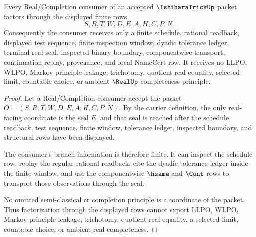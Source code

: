 \begin{theorem}
\label{thm:ishihara-trick-real-seal-nonescape}
Every Real/Completion consumer of an accepted $\IshiharaTrickUp$ packet factors through the displayed finite rows
$$
S,R,T,W,D,E,A,H,C,P,N.
$$
Consequently the consumer receives only a finite schedule, rational readback, displayed test sequence, finite inspection window, dyadic tolerance ledger, terminal real seal, inspected binary boundary, componentwise transport, continuation replay, provenance, and local NameCert row. It receives no LLPO, WLPO, Markov-principle leakage, trichotomy, quotient real equality, selected limit, countable choice, or ambient $\RealUp$ completeness principle.
\end{theorem}
\begin{proof}
Let a Real/Completion consumer accept the packet $O=(S,R,T,W,D,E,A,H,C,P,N)$. By the carrier definition, the only real-facing coordinate is the seal $E$, and that seal is reached after the schedule, readback, test sequence, finite window, tolerance ledger, inspected boundary, and structural rows have been displayed.

The consumer's branch information is therefore finite. It can inspect the schedule row, replay the regular-rational readback, cite the dyadic tolerance ledger inside the finite window, and use the componentwise $\hsame$ and $\Cont$ rows to transport those observations through the seal.

No omitted semi-classical or completion principle is a coordinate of the packet. Thus factorization through the displayed rows cannot export LLPO, WLPO, Markov-principle leakage, trichotomy, quotient real equality, a selected limit, countable choice, or ambient real completeness.
\end{proof}

